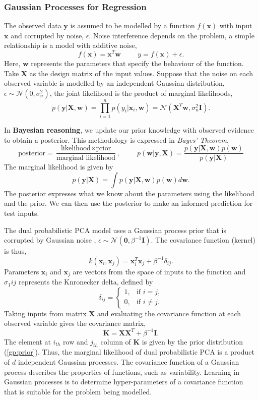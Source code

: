 \documentclass[ %
author={Dillon Keith Diep},
supervisor={Dr. Carl Henrik Ek},
degree={MEng},
title={ART-CG:},
subtitle={Assisted Real-time Content Generation of 3D Hair by Learning Manifolds},
type={Research},
year={2017} ]{dissertation}
\begin{document}
\subsubsection{Gaussian Processes for Regression}
The observed data $\bm{y}$ is assumed to be modelled by a function $f(\bm{x})$ with input $\bm{x}$ and corrupted by noise, $\epsilon$. Noise interference depends on the problem, a simple relationship is a model with additive noise,
$$f(\bm{x})=\bm{x}^T\bm{w}
\hspace{1cm}
y = f(\bm{x}) + \epsilon.$$
Here, $\bm{w}$ represents the parameters that specify the behaviour of the function. Take $\bm{X}$ as the design matrix of the input values. Suppose that the noise on each observed variable is modelled by an independent Gaussian distribution, $\epsilon\sim\mathcal{N}(0, \sigma^2_n)$, the joint likelihood is the product of marginal likelihoods,
$$p(\bm{y}|\bm{X},\bm{w})=\prod^n_{i=1}p(y_i|\bm{x}_i, \bm{w})=\mathcal{N}(\bm{X}^T\bm{w}, \sigma^2_n\bm{I}).$$

In \textbf{Bayesian reasoning}, we update our prior knowledge with observed evidence to obtain a posterior. This methodology is expressed in \textit{Bayes' Theorem},
$$\text{posterior}=\frac{\text{likelihood}\times\text{prior}}{\text{marginal likelihood}}, \hspace{1cm} p(\bm{w}|\bm{y},\bm{X})=\frac{p(\bm{y}|\bm{X},\bm{w})p(\bm{w})}{p(\bm{y}|\bm{X})}$$
The marginal likelihood is given by
$$p(\bm{y}|\bm{X})=\int p(\bm{y}|\bm{X},\bm{w})p(\bm{w})d\bm{w}.$$
The posterior expresses what we know about the parameters using the likelihood and the prior. We can then use the posterior to make an informed prediction for test inputs.

The dual probabilistic PCA model uses a Gaussian process prior that is corrupted by Gaussian noise \cite{gplvm}, $\epsilon\sim\mathcal{N}(\bm{0},\beta^{-1}\bm{I})$.
The covariance function (kernel) is thus,
\begin{equation} \label{gp:prior}
k(\bm{x}_i,\bm{x}_j)=\bm{x}^T_i\bm{x}_j+\beta^{-1}\delta_{ij}.
\end{equation}
Parameters $\bm{x}_i$ and $\bm{x}_j$ are vectors from the space of inputs to the function and $\sigma_1{ij}$ represents the Knronecker delta, defined by 
$$
\delta_{ij} =
\begin{cases}
1, &         \text{if } i=j,\\
0, &         \text{if } i\neq j.
\end{cases}
$$
Taking inputs from matrix $\bm{X}$ and evaluating the covariance function at each observed variable gives the covariance matrix,
$$\bm{K=XX}^T+\beta^{-1}\bm{I}.$$
The element at $i_{th}$ row and $j_{th}$ column of $\bm{K}$ is given by the prior distribution (\ref{gp:prior}). Thus, the marginal likelihood of dual probabilistic PCA is a product of $d$ independent Gaussian processes. The covariance function of a Gaussian process describes the properties of functions, such as variability. Learning in Gaussian processes is to determine hyper-parameters of a covariance function that is suitable for the problem being modelled.
\end{document}
